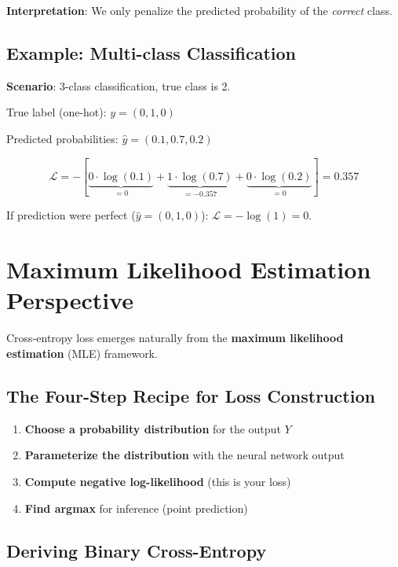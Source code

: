 \textbf{Interpretation}: We only penalize the predicted probability of the \textit{correct} class.

\subsection{Example: Multi-class Classification}

\textbf{Scenario}: 3-class classification, true class is 2.

True label (one-hot): $y = (0, 1, 0)$

Predicted probabilities: $\hat{y} = (0.1, 0.7, 0.2)$

\[
\mathcal{L} = -[\underbrace{0 \cdot \log(0.1)}_{=0} + \underbrace{1 \cdot \log(0.7)}_{=-0.357} + \underbrace{0 \cdot \log(0.2)}_{=0}] = 0.357
\]

If prediction were perfect ($\hat{y} = (0, 1, 0)$): $\mathcal{L} = -\log(1) = 0$.

\section{Maximum Likelihood Estimation Perspective}

Cross-entropy loss emerges naturally from the \textbf{maximum likelihood estimation} (MLE) framework.

\subsection{The Four-Step Recipe for Loss Construction}

\begin{algorithm}
\begin{enumerate}
    \item \textbf{Choose a probability distribution} for the output $Y$
    \item \textbf{Parameterize the distribution} with the neural network output
    \item \textbf{Compute negative log-likelihood} (this is your loss)
    \item \textbf{Find argmax} for inference (point prediction)
\end{enumerate}
\end{algorithm}

\subsection{Deriving Binary Cross-Entropy}


